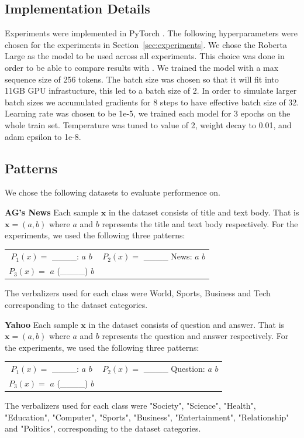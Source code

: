 \documentclass[11pt,a4paper]{article}
\begin{document}
\subsection{Implementation Details}
\label{apx:implementation-details}
Experiments were implemented in PyTorch \citep{NEURIPS2019_9015}.
The following hyperparameters were chosen for the experiments in Section~\ref{sec:experiments}.
We chose the Roberta Large as the model to be used across all experiments.
This choice was done in order to be able to compare results with \citet{schick2020exploiting}.
We trained the model with a max sequence size of 256 tokens.
The batch size was chosen so that it will fit into 11GB GPU infrastucture, this led to a batch size of 2. 
In order to simulate larger batch sizes we accumulated gradients for 8 steps to have effective batch size of 32.
Learning rate was chosen to be 1e-5, we trained each model for 3 epochs on the whole train set.
Temperature was tuned to value of 2, weight decay to 0.01, and adam epsilon to 1e-8.

\subsection{Patterns}
\label{apx:patterns}
We chose the following datasets to evaluate performence on.

\vspace{8pt}
\noindent \textbf{AG's News} \quad
Each sample $\textbf{x}$ in the dataset consists of title and text body.
That is $\textbf{x}=(a, b)$ where $a$ and $b$ represents the title and text body respectively.
For the experiments, we used the following three patterns:
\begin{table}[H]
	\renewcommand{\arraystretch}{1.5}
	\begin{tabularx}{\textwidth}{cc}
		 $P_1(x)=$ \_\_\_\_: $a$ $b$ & $P_2(x)=$ \_\_\_\_ News: $a$ $b$ \\
		 $P_3(x)=$ $a$ (\_\_\_\_) $b$ &  \\
	\end{tabularx}
\end{table}
The verbalizers used for each class were World, Sports, Business and Tech corresponding to the dataset categories.

\vspace{8pt}
\noindent \textbf{Yahoo} \quad
Each sample $\textbf{x}$ in the dataset consists of question and answer.
That is $\textbf{x}=(a, b)$ where $a$ and $b$ represents the question and answer respectively.
For the experiments, we used the following three patterns:
\begin{table}[H]
	\renewcommand{\arraystretch}{1.5}
	\begin{tabularx}{\textwidth}{cc}
		$P_1(x)=$ \_\_\_\_: $a$ $b$ & $P_2(x)=$ \_\_\_\_ Question: $a$ $b$ \\
		$P_3(x)=$ $a$ (\_\_\_\_) $b$ &  \\
	\end{tabularx}
\end{table}
The verbalizers used for each class were "Society", "Science", "Health", "Education", "Computer", "Sports", "Business", "Entertainment", "Relationship" and "Politics", corresponding to the dataset categories.
\end{document}
